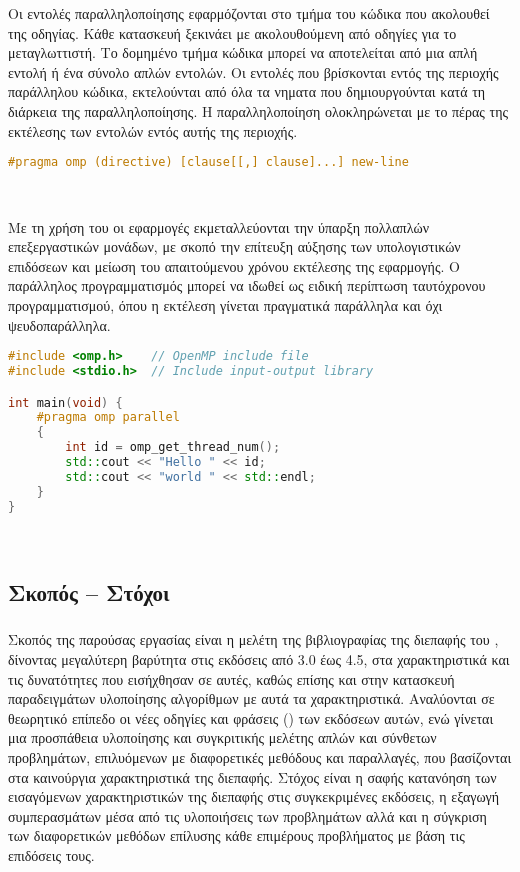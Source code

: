 Οι εντολές παραλληλοποίησης εφαρμόζονται στο τμήμα του κώδικα που ακολουθεί της οδηγίας. Κάθε
κατασκευή ξεκινάει με \textbf{\emph{}} ακολουθούμενη από οδηγίες για το
μεταγλωττιστή. Το δομημένο τμήμα κώδικα μπορεί να αποτελείται από μια απλή εντολή ή ένα σύνολο απλών
εντολών\cite{ompsyntaxrefguide}. Οι εντολές που βρίσκονται εντός της περιοχής παράλληλου κώδικα,
εκτελούνται από όλα τα νηματα που δημιουργούνται κατά τη διάρκεια της παραλληλοποίησης. Η
παραλληλοποίηση ολοκληρώνεται με το πέρας της εκτέλεσης των εντολών εντός αυτής της περιοχής. \ \\
\begin{lstlisting}[language=C++, caption={\el{Γραμματική σύνταξης οδηγίας} OpenMP}, frame = single, xleftmargin=.1\textwidth]
#pragma omp (directive) [clause[[,] clause]...] new-line
\end{lstlisting} 
\ \\
\par
Με τη χρήση του \emph{} οι εφαρμογές εκμεταλλεύονται την ύπαρξη πολλαπλών επεξεργαστικών
μονάδων, με σκοπό την επίτευξη αύξησης των υπολογιστικών επιδόσεων και μείωση του απαιτούμενου
χρόνου εκτέλεσης της εφαρμογής. Ο παράλληλος προγραμματισμός μπορεί να ιδωθεί ως ειδική περίπτωση
ταυτόχρονου προγραμματισμού, όπου η εκτέλεση γίνεται πραγματικά παράλληλα και όχι
ψευδοπαράλληλα\cite{googleparallelprog}. \ \\
\begin{spacing}{1.1}
\begin{lstlisting}[language=C++, caption={\el{Παράδειγμα παράλληλου κώδικα} OpenMP}, frame=tb]
#include <omp.h>    // OpenMP include file
#include <stdio.h>  // Include input-output library

int main(void) {
    #pragma omp parallel 
    {
        int id = omp_get_thread_num();
        std::cout << "Hello " << id;
        std::cout << "world " << std::endl;
    }
}
\end{lstlisting}
\end{spacing}
\ \\
\subsection{Σκοπός – Στόχοι}
\subparagraph{}
Σκοπός της παρούσας εργασίας είναι η μελέτη της βιβλιογραφίας της διεπαφής του \emph{},
δίνοντας μεγαλύτερη βαρύτητα στις εκδόσεις από 3.0 έως 4.5, στα χαρακτηριστικά και τις δυνατότητες
που εισήχθησαν σε αυτές, καθώς επίσης και στην κατασκευή παραδειγμάτων υλοποίησης αλγορίθμων με αυτά
τα χαρακτηριστικά. Αναλύονται σε θεωρητικό επίπεδο οι νέες οδηγίες και φράσεις (\emph{})
των εκδόσεων αυτών, ενώ γίνεται μια προσπάθεια υλοποίησης και συγκριτικής μελέτης απλών και σύνθετων
προβλημάτων, επιλυόμενων με διαφορετικές μεθόδους και παραλλαγές, που βασίζονται στα καινούργια
χαρακτηριστικά της διεπαφής. Στόχος είναι η σαφής κατανόηση των εισαγόμενων χαρακτηριστικών της
διεπαφής στις συγκεκριμένες εκδόσεις, η εξαγωγή συμπερασμάτων μέσα από τις υλοποιήσεις των
προβλημάτων αλλά και η σύγκριση των διαφορετικών μεθόδων επίλυσης κάθε επιμέρους προβλήματος με βάση
τις επιδόσεις τους.

